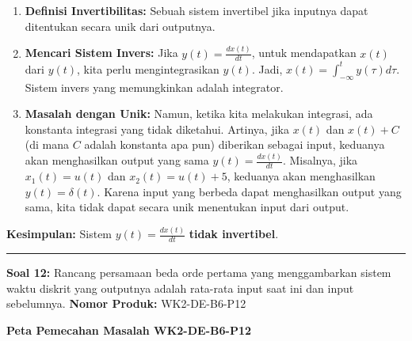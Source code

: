 \documentclass[
  letterpaper,
  DIV=11,
  numbers=noendperiod]{scrreprt}
\providecommand{\tightlist}{%
  \setlength{\itemsep}{0pt}\setlength{\parskip}{0pt}}
\begin{document}
\begin{enumerate}
\def\labelenumi{\arabic{enumi}.}
\tightlist
\item
  \textbf{Definisi Invertibilitas:} Sebuah sistem invertibel jika
  inputnya dapat ditentukan secara unik dari outputnya.
\item
  \textbf{Mencari Sistem Invers:} Jika \(y(t) = \frac{dx(t)}{dt}\),
  untuk mendapatkan \(x(t)\) dari \(y(t)\), kita perlu mengintegrasikan
  \(y(t)\). Jadi, \(x(t) = \int_{-\infty}^{t} y(\tau) d\tau\). Sistem
  invers yang memungkinkan adalah integrator.
\item
  \textbf{Masalah dengan Unik:} Namun, ketika kita melakukan integrasi,
  ada konstanta integrasi yang tidak diketahui. Artinya, jika \(x(t)\)
  dan \(x(t) + C\) (di mana \(C\) adalah konstanta apa pun) diberikan
  sebagai input, keduanya akan menghasilkan output yang sama
  \(y(t) = \frac{dx(t)}{dt}\). Misalnya, jika \(x_1(t) = u(t)\) dan
  \(x_2(t) = u(t) + 5\), keduanya akan menghasilkan
  \(y(t) = \delta(t)\). Karena input yang berbeda dapat menghasilkan
  output yang sama, kita tidak dapat secara unik menentukan input dari
  output.
\end{enumerate}

\textbf{Kesimpulan:} Sistem \(y(t) = \frac{dx(t)}{dt}\) \textbf{tidak
invertibel}.

\begin{center}\rule{0.5\linewidth}{0.5pt}\end{center}

\textbf{Soal 12:} Rancang persamaan beda orde pertama yang menggambarkan
sistem waktu diskrit yang outputnya adalah rata-rata input saat ini dan
input sebelumnya. \textbf{Nomor Produk:} WK2-DE-B6-P12

\textbf{Peta Pemecahan Masalah WK2-DE-B6-P12}
\end{document}
